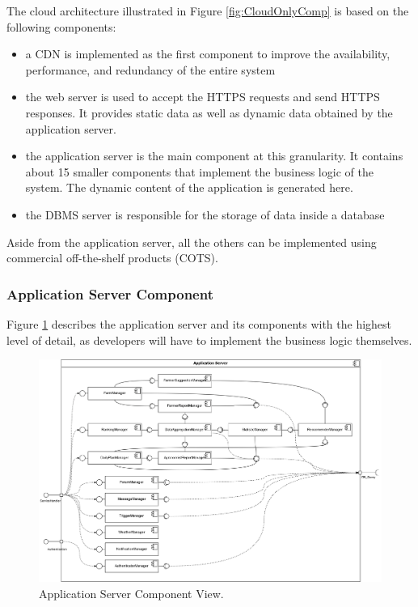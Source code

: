 The cloud architecture illustrated in Figure \ref{fig:CloudOnlyComp} is based on the following components:
\begin{itemize}
	\item a CDN is implemented as the first component to improve the availability, performance, and redundancy of the entire system
	\item the web server is used to accept the HTTPS requests and send HTTPS responses. It provides static data as well as dynamic data obtained by the application server.
	\item the application server is the main component at this granularity. It contains about 15 smaller components that implement the business logic of the system. The dynamic content of the application is generated here.
	\item the DBMS server is responsible for the storage of data inside a database
\end{itemize}
Aside from the application server, all the others can be implemented using commercial off-the-shelf products (COTS). \\

\subsubsection{Application Server Component}

Figure \ref{fig:ApplicationServerOnlyComp} describes the application server and its components with the highest level of detail, as developers will have to implement the business logic themselves.\\

\begin{figure}[hbt!]
\centering
\includegraphics[width=\textwidth]{../images_diagrams/dd/component_only_application.png}
\caption{Application Server Component View.}
\label{fig:ApplicationServerOnlyComp}
\end{figure}

